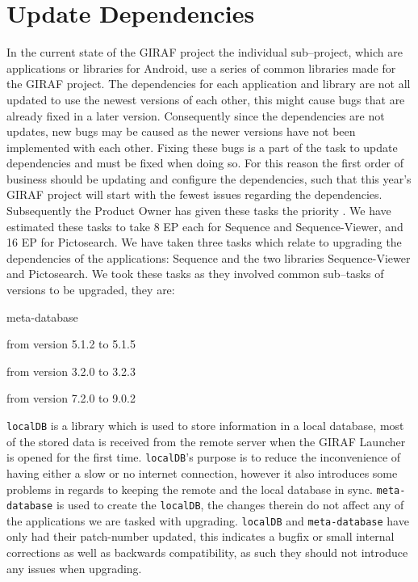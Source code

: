 \section{Update Dependencies}
In the current state of the GIRAF project the individual sub--project, which are applications or libraries for Android, use a series of common libraries made for the GIRAF project.
The dependencies for each application and library are not all updated to use the newest versions of each other, this might cause bugs that are already fixed in a later version.
Consequently since the dependencies are not updates, new bugs may be caused as the newer versions have not been implemented with each other.
Fixing these bugs is a part of the task to update dependencies and must be fixed when doing so.
For this reason the first order of business should be updating and configure the dependencies, such that this year's GIRAF project will start with the fewest issues regarding the dependencies.
Subsequently the Product Owner has given these tasks the priority \phigh.
We have estimated these tasks to take 8 EP each for Sequence and Sequence-Viewer, and 16 EP for Pictosearch.
We have taken three tasks which relate to upgrading the dependencies of the applications: Sequence and the two libraries Sequence-Viewer and Pictosearch.
We took these tasks as they involved common sub--tasks of versions to be upgraded, they are:
\begin{dankscription}{\ttfamily}{meta-database}
    \item[localDB] from version 5.1.2 to 5.1.5
    \item[meta-database] from version 3.2.0 to 3.2.3
    \item[oasisLib] from version 7.2.0 to 9.0.2
\end{dankscription}
\texttt{localDB} is a library which is used to store information in a local database, most of the stored data is received from the remote server when the GIRAF Launcher is opened for the first time.
\texttt{localDB}'s purpose is to reduce the inconvenience of having either a slow or no internet connection, however it also introduces some problems in regards to keeping the remote and the local database in sync.
\texttt{meta-database} is used to create the \texttt{localDB}, the changes therein do not affect any of the applications we are tasked with upgrading.
\texttt{localDB} and \texttt{meta-database} have only had their patch-number updated, this indicates a bugfix or small internal corrections as well as backwards compatibility, as such they should not introduce any issues when upgrading.


